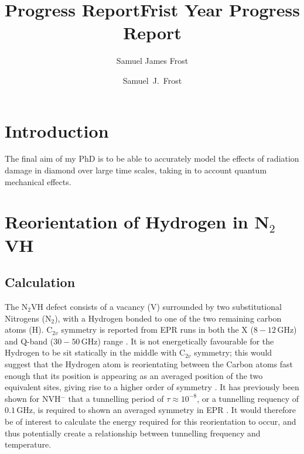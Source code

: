 \documentclass[10pt,a4paper,twocolumn,twoside]{extarticle}
\title{Progress Report}
\author{Samuel James Frost}
\title{Frist Year Progress Report}
\author{Samuel~J.~Frost}
\newcommand{\ntvh}{N$_2$VH }
\begin{document}
	\thispagestyle{empty}
	\tableofcontents

	
\section{Introduction}
The final aim of my PhD is to be able to accurately model the effects of radiation damage in diamond over large time scales, taking in to account quantum mechanical effects.

\section{Reorientation of Hydrogen in N$_2$VH}
\label{n2vh}
\subsection{Calculation}
\label{n2vh_calc}
The \ntvh defect consists of a vacancy (V) surrounded by two substitutional Nitrogens (N$_2$), with a Hydrogen bonded to one of the two remaining carbon atoms (H). C$_{2v}$ symmetry is reported from EPR runs in both the X ($8-12$\,GHz) and Q-band ($30-50$\,GHz) range \cite{Hartland}. It is not energetically favourable for the Hydrogen to be sit statically in the middle with C$_{2v}$ symmetry; this would suggest that the Hydrogen atom is reorientating between the Carbon atoms fast enough that its position is appearing as an averaged position of the two equivalent sites, giving rise to a higher order of symmetry \cite{Shaw_QT_VH}. 
It has previously been shown for NVH$^-$ that a tunnelling period of $\tau \approx 10^{-8}$, or a tunnelling requency of $0.1$\,GHz, is required to shown an averaged symmetry in EPR \cite{Edwards_N2VH_rate}. It would therefore be of interest to calculate the energy required for this reorientation to occur, and thus potentially create a relationship between tunnelling frequency and temperature. 
\end{document}
